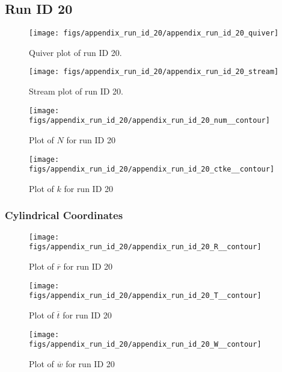 \subsection{Run ID 20}
\begin{figure}[H]
\centering
\texttt{[image: figs/appendix\_run\_id\_20/appendix\_run\_id\_20\_quiver]}
\caption{Quiver plot of run ID 20.}
\label{fig:appendix_run_id_20_quiver}
\end{figure}


\begin{figure}[H]
\centering
\texttt{[image: figs/appendix\_run\_id\_20/appendix\_run\_id\_20\_stream]}
\caption{Stream plot of run ID 20.}
\label{fig:appendix_run_id_20_stream}
\end{figure}


\begin{figure}[H]
\centering
\texttt{[image: figs/appendix\_run\_id\_20/appendix\_run\_id\_20\_num\_\_contour]}
\caption{Plot of $N$ for run ID 20}
\label{fig:appendix_run_id_20_num__contour}
\end{figure}


\begin{figure}[H]
\centering
\texttt{[image: figs/appendix\_run\_id\_20/appendix\_run\_id\_20\_ctke\_\_contour]}
\caption{Plot of $k$ for run ID 20}
\label{fig:appendix_run_id_20_ctke__contour}
\end{figure}


\subsubsection{Cylindrical Coordinates}
\begin{figure}[H]
\centering
\texttt{[image: figs/appendix\_run\_id\_20/appendix\_run\_id\_20\_R\_\_contour]}
\caption{Plot of $\overline{r}$ for run ID 20}
\label{fig:appendix_run_id_20_R__contour}
\end{figure}


\begin{figure}[H]
\centering
\texttt{[image: figs/appendix\_run\_id\_20/appendix\_run\_id\_20\_T\_\_contour]}
\caption{Plot of $\overline{t}$ for run ID 20}
\label{fig:appendix_run_id_20_T__contour}
\end{figure}


\begin{figure}[H]
\centering
\texttt{[image: figs/appendix\_run\_id\_20/appendix\_run\_id\_20\_W\_\_contour]}
\caption{Plot of $\overline{w}$ for run ID 20}
\label{fig:appendix_run_id_20_W__contour}
\end{figure}


